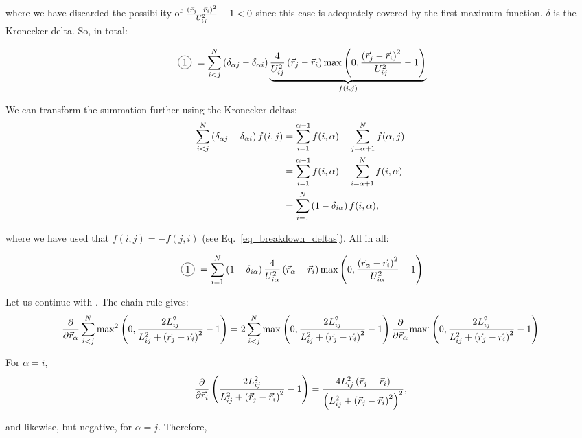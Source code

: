 \documentclass[a4paper]{article}
\newcommand*\circled[1]{
  \tikz[baseline=(char.base)]{
    \node[shape=circle,draw,inner sep=2pt] (char) {#1};
  }
}
\begin{document}
where we have discarded the possibility of $\frac{ \left( \vec{r}_{j} - \vec{r}_{i} \right)^{2} }{ U_{ij}^{2} } - 1 < 0$
since this case is adequately covered by the first maximum function. $\delta$ is
the Kronecker delta. So, in total:

\begin{equation}\label{eq_breakdown_deltas}
  \text{\circled{1}}
  = \ijNSum \left(
    \delta_{\alpha j} - \delta_{\alpha i} 
  \right) \underbrace{
    \frac{4}{U_{ij}^{2}} \posVecDiff{j}{i} \distanceErrorFirstTerm{}
  }_{f(i, j)}
\end{equation}

We can transform the summation further using the Kronecker deltas:
\begin{align}
  \sum_{i < j}^{N} \left( \delta_{\alpha j} - \delta_{\alpha i} \right) f(i, j)
  &= \sum_{i = 1}^{\alpha - 1} f(i, \alpha) 
    - \sum_{j = \alpha + 1}^{N} f(\alpha, j)\\
  &= \sum_{i = 1}^{\alpha - 1} f(i, \alpha) 
    + \sum_{i = \alpha + 1}^{N} f(i, \alpha)\\
  &= \sum_{i = 1}^{N} \left(1 - \delta_{i\alpha} \right) f(i, \alpha),
\end{align}

where we have used that $f(i, j) = -f(j, i)$ (see Eq.~\ref{eq_breakdown_deltas}).
All in all:

\begin{equation}
  \text{\circled{1}}
  = \iNSum \left(1 - \delta_{i\alpha}\right) \frac{4}{U_{i\alpha}^{2}}
    \posVecDiff{\alpha}{i} \textrm{max} \left(
      0,
      \frac{
        \posVecDiff{\alpha}{i}^{2}
      }{
        U_{i\alpha}^{2}
      } - 1
    \right)
\end{equation}

\newpage
Let us continue with \circled{2}. The chain rule gives:
\begin{equation}
  \frac{\partial}{\partial \vec{r}_{\alpha}} \sum_{i < j}^{N} \textrm{max}^{2} \left( 0, \frac{ 2 L_{ij}^{2} }{ L_{ij}^{2} + \left( \vec{r}_{j} - \vec{r}_{i} \right)^{2} } - 1 \right)
  = 2 \sum_{i < j}^{N} \textrm{max}^{} \left( 0, \frac{ 2 L_{ij}^{2} }{ L_{ij}^{2} + \left( \vec{r}_{j} - \vec{r}_{i} \right)^{2} } - 1 \right) \frac{\partial}{\partial \vec{r}_{\alpha}}
    \textrm{max}^{.} \left( 0, \frac{ 2 L_{ij}^{2} }{ L_{ij}^{2} + \left( \vec{r}_{j} - \vec{r}_{i} \right)^{2} } - 1 \right)
\end{equation}

For $\alpha = i$,
\begin{equation}
  \frac{\partial}{\partial \vec{r}_{i}} \left( \frac{ 2 L_{ij}^{2} }{ L_{ij}^{2} + \left( \vec{r}_{j} - \vec{r}_{i} \right)^{2} } - 1 \right)
  = \frac{
    4 L_{ij}^{2} \left( \vec{r}_{j} - \vec{r}_{i} \right)
  }{
    \left(
      L_{ij}^{2} + \left( \vec{r}_{j} - \vec{r}_{i} \right)^2
    \right)^2
  },
\end{equation}

and likewise, but negative, for $\alpha = j$. Therefore,
\end{document}
